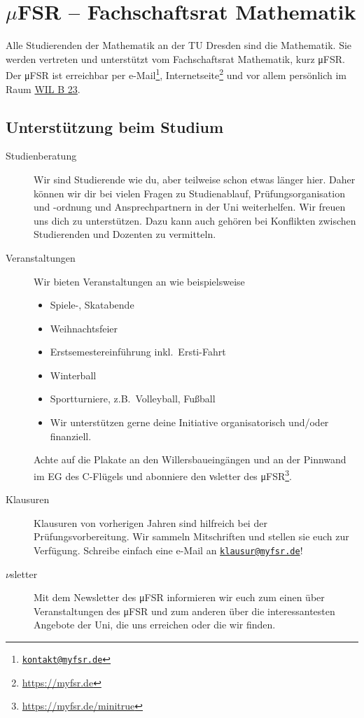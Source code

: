 \documentclass{scrartcl}
\begin{document}
\section*{\texorpdfstring{$\mu$}{my}FSR -- Fachschaftsrat Mathematik}
Alle Studierenden der Mathematik an der TU Dresden sind die  Mathematik.
Sie werden vertreten und unterstützt vom Fachschaftsrat Mathematik, kurz μFSR.
%
Der μFSR ist erreichbar per e-Mail\footnote{\href{mailto:kontakt@myfsr.de}{\nolinkurl{kontakt@myfsr.de}}},
Internetseite\footnote{\url{https://myfsr.de}} und vor allem persönlich im Raum
\href{https://navigator.tu-dresden.de/etplan/wil/-1/raum/2193-1.0170}{WIL B 23}.

\subsection*{Unterstützung beim Studium}
\label{sub:unterstutzung_beim_studium}
\begin{description}
  \item[Studienberatung] Wir sind Studierende wie du, aber teilweise schon etwas länger hier.
    Daher können wir dir bei vielen Fragen zu Studienablauf, Prüfungsorganisation und -ordnung und Ansprechpartnern in der Uni weiterhelfen.
    Wir freuen uns dich zu unterstützen.
    Dazu kann auch gehören bei Konflikten zwischen Studierenden und Dozenten zu vermitteln.
  \item[Veranstaltungen] Wir bieten Veranstaltungen an wie beispielsweise
    \begin{itemize}
      \item Spiele-, Skatabende
      \item Weihnachtsfeier
      \item Erstsemestereinführung inkl.\ Ersti-Fahrt
      \item Winterball
      \item Sportturniere, z.B.\ Volleyball, Fußball
      \item Wir unterstützen gerne deine Initiative organisatorisch und/oder finanziell.
    \end{itemize}
    Achte auf die Plakate an den Willersbaueingängen und an der Pinnwand im EG des C-Flügels und
    abonniere den νsletter des μFSR\footnote{\url{https://myfsr.de/minitrue}}.
  \item[Klausuren] Klausuren von vorherigen Jahren sind hilfreich bei der Prüfungsvorbereitung.
    Wir sammeln Mitschriften und stellen sie euch zur Verfügung.
    Schreibe einfach eine e-Mail an \href{mailto:klausur@myfsr.de}{\nolinkurl{klausur@myfsr.de}}!
  \item[$\nu$sletter] Mit dem Newsletter des μFSR informieren wir euch zum einen über
    Veranstaltungen des μFSR und zum anderen über die interessantesten Angebote der Uni,
    die uns erreichen oder die wir finden.
\end{description}
\end{document}
